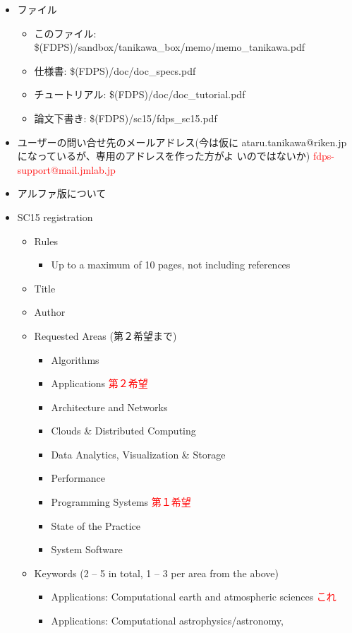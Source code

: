 \documentclass[12pt,a4paper]{jarticle}
\newcommand{\redtext}[1]{\textcolor{red}{#1}}
\begin{document}
\begin{itemize}
\item ファイル
  \begin{itemize}
  \item このファイル: \$(FDPS)/sandbox/tanikawa\_box/memo/memo\_tanikawa.pdf
  \item 仕様書: \$(FDPS)/doc/doc\_specs.pdf
  \item チュートリアル: \$(FDPS)/doc/doc\_tutorial.pdf
  \item 論文下書き: \$(FDPS)/sc15/fdps\_sc15.pdf
  \end{itemize}
\item ユーザーの問い合せ先のメールアドレス(今は仮に
  ataru.tanikawa@riken.jpになっているが、専用のアドレスを作った方がよ
  いのではないか) \redtext{fdps-support@mail.jmlab.jp}
\item アルファ版について
\item SC15 registration
  \begin{itemize}
  \item Rules
    \begin{itemize}
    \item Up to a maximum of 10 pages, not including references
    \end{itemize}
  \item Title
  \item Author
  \item Requested Areas (第２希望まで)
    \begin{itemize}
    \item Algorithms
    \item Applications \redtext{第２希望}
    \item Architecture and Networks
    \item Clouds \& Distributed Computing
    \item Data Analytics, Visualization \& Storage
    \item Performance
    \item Programming Systems \redtext{第１希望}
    \item State of the Practice
    \item System Software
    \end{itemize}
  \item Keywords (2 -- 5 in total, 1 -- 3 per area from the above)
    \begin{itemize}
    \item Applications: Computational earth and atmospheric sciences
      \redtext{これ}
    \item Applications: Computational astrophysics/astronomy,

\end{itemize}
\end{itemize}
\end{itemize}
\end{document}
